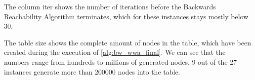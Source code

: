 The column iter shows the number of iterations before the Backwards Reachability Algorithm terminates, which for these instances stays mostly below 30.

The table size shows the complete amount of nodes in the table, which have been created during the execution of \autoref{alg:bw_wwa_final}. We can see that the numbers range from hundreds to millions of generated nodes. 9 out of the 27 instances generate more than 200000 nodes into the table.

\begin{table}[H]
\centering
{}
\end{table}
